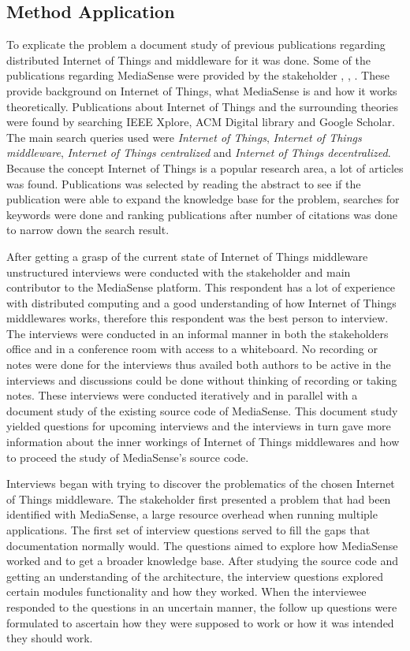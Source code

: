 \subsection{Method Application}
To explicate the problem a document study of previous publications regarding distributed Internet of Things and middleware for it was done. Some of the publications regarding MediaSense were provided by the stakeholder \cite{TheMediaSenseFramework}, \cite{Kanter539187}, \cite{Walters413794}. These provide background on Internet of Things, what MediaSense is and how it works theoretically. Publications about Internet of Things and the surrounding theories were found by searching IEEE Xplore, ACM Digital library and Google Scholar. The main search queries used were \emph{Internet of Things}, \emph{Internet of Things middleware}, \emph{Internet of Things centralized} and \emph{Internet of Things decentralized}. Because the concept Internet of Things is a popular research area, a lot of articles was found. Publications was selected by reading the abstract to see if the publication were able to expand the knowledge base for the problem, searches for keywords were done and ranking publications after number of citations was done to narrow down the search result. 

After getting a grasp of the current state of Internet of Things middleware unstructured interviews were conducted with the stakeholder and main contributor to the MediaSense platform. This respondent has a lot of experience with distributed computing and a good understanding of how Internet of Things middlewares works, therefore this respondent was the best person to interview. The interviews were conducted in an informal manner in both the stakeholders office and in a conference room with access to a whiteboard. No recording or notes were done for the interviews thus availed both authors to be active in the interviews and discussions could be done without thinking of recording or taking notes. These interviews were conducted iteratively and in parallel with a document study of the existing source code of MediaSense. This document study yielded questions for upcoming interviews and the interviews in turn gave more information about the inner workings of Internet of Things middlewares and how to proceed the study of MediaSense's source code.

Interviews began with trying to discover the problematics of the chosen Internet of Things middleware. The stakeholder first presented a problem that had been identified with MediaSense, a large resource overhead when running multiple applications. The first set of interview questions served to fill the gaps that documentation normally would. The questions aimed to explore how MediaSense worked and to get a broader knowledge base. After studying the source code and getting an understanding of the architecture, the interview questions explored certain modules functionality and how they worked. When the interviewee responded to the questions in an uncertain manner, the follow up questions were formulated to ascertain how they were supposed to work or how it was intended they should work.

